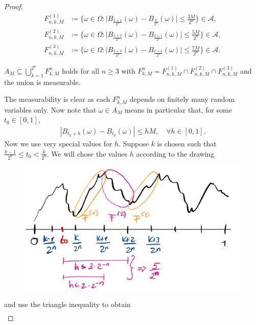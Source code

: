 \begin{proof}[Proof]
	\begin{align*}
		F_{n,k,M}^{(1)} &\coloneqq \Big\{ \omega \in \Omega \colon \Big\vert B_{\frac{k+1}{2^n}}(\omega)- B_{\frac{k}{2^n}}(\omega)\Big\vert \leq \frac{3M}{2^n}\Big\}\in \mathcal A, \\
		F_{n,k,M}^{(2)} &\coloneqq \Big\{ \omega \in \Omega \colon \Big\vert B_{\frac{k+2}{2^n}}(\omega)- B_{\frac{k+1}{2^n}}(\omega)\Big\vert \leq \frac{5M}{2^n}\Big\}\in \mathcal A, \\
		F_{n,k,M}^{(3)} &\coloneqq \Big\{ \omega \in \Omega \colon \Big\vert B_{\frac{k+3}{2^n}}(\omega)- B_{\frac{k+2}{2^n}}(\omega)\Big\vert \leq \frac{7M}{2^n}\Big\}\in \mathcal A.
	\end{align*}
	\begin{lstep}
		$A_M\subseteq \bigcup_{k=1}^{2^n} F^n_{k,M}$ holds for all $n\geq 3$ with $F^n_{k,M} = F_{n,k,M}^{(1)} \cap F_{n,k,M}^{(2)} \cap F_{n,k,M}^{(3)}$ and the union is measurable.
	\end{lstep}
	The measurability is clear as each $F^n_{k,M}$ depends on finitely many random variables only. Now note that $\omega \in  A_M$ means in particular that, for some $t_0\in [0,1]$,
	\begin{align}\label{J}
		|B_{t_0+h}(\omega)-B_{t_0}(\omega)|\leq h M,\quad \forall h\in [0,1].
	\end{align}
	Now we use very special values for $h$. Suppose $k$ is chosen such that $\frac{k-1}{2^n}\leq t_0< \frac{k}{2^n}$. We will chose the values $h$ according to the drawing 
	\begin{figure}[h]
		\begin{center}
			\includegraphics[scale=0.14]{diff.jpeg}
		\end{center}
	\end{figure}
	and use the triangle inequality to obtain 
	\begin{align*}

\end{align*}
\end{proof}
